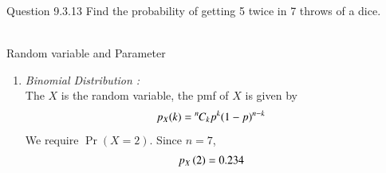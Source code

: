 \documentclass[journal,12pt,onecolumn]{IEEEtran}
\theoremstyle{remark}
\begin{document}
Question 9.3.13
Find the probability of getting 5 twice in 7 throws of a dice.\\
\solution\\
\fi
\begin{table}[ht!]
	\centering
	
	\caption{Random variable and Parameter}
	\label{tab:gausstab2_9.3.3}
\end{table}
\begin{enumerate}
   \item{ \em{Binomial Distribution :}}\\The $X$ is the random variable, the pmf of $X$ is given by
    \begin{align}
p_X(k)&={{}^{n}\mkern-1muC_{k}}p^k(1-p)^{n-k}
\end{align}    
  We require $\Pr(X = 2)$. Since $n = 7$,
             \begin{align}
                p_X\left(2\right) &= 0.234
             \end{align}
             

\end{enumerate}
\end{document}
